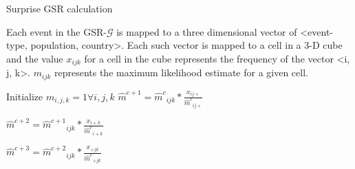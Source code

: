 \begin{algorithm}
\caption{Surprise GSR calculation}
\begin{algorithmic}[1]


\State Each event in the GSR-$\mathcal{G}$ is mapped to a three dimensional vector of <event-type, population, country>. Each such vector
       is mapped to a cell in a 3-D cube and the value $x_{ijk}$ for a cell in the cube represents the frequency of the vector <i, j, k>.
       $m_{ijk}$ represents the maximum likelihood estimate for a given cell.

\State Initialize $m_{i,j,k}=1 \forall i,j,k$
\State $\hat{m}^{c+1} = {\hat{m}^c}_{ijk}*\frac{x_{ij+}}{{\hat{m}^c}_{ij+}} $

\State $\hat{m}^{c+2} = {\hat{m}^{c+1}}_{ijk}*\frac{x_{i+k}}{{\hat{m}^c}_{i+k}} $

\State $\hat{m}^{c+3} = {\hat{m}^{c+2}}_{ijk}*\frac{x_{+jk}}{{\hat{m}^c}_{+jk}} $

\EndFor



\EndIf

\EndFor


\EndProcedure

\end{algorithmic}

\label{algo:maxent}

\end{algorithm}
